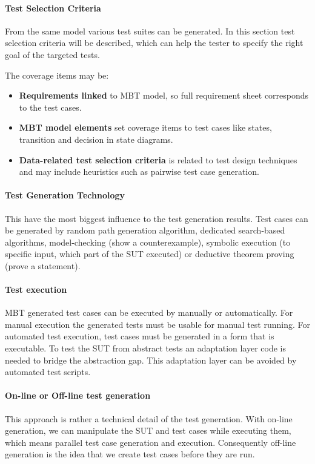 \paragraph{Test Selection Criteria}
From the same model various test suites can be generated. In this section test selection criteria will be described, which can help the tester to specify the right goal of the targeted tests. 

The coverage items may be:
\begin{itemize}
	\item \textbf{Requirements linked} to MBT model, so full requirement sheet corresponds to the test cases.
	\item \textbf{MBT model elements} set coverage items to test cases like states, transition and decision in state diagrams.
	\item \textbf{Data-related test selection criteria} is related to test design techniques and may include heuristics such as pairwise test case generation.
\end{itemize}

\paragraph{Test Generation Technology}
This have the most biggest influence to the test generation results. Test cases can be generated by random path generation algorithm, dedicated search-based algorithms, model-checking (show a counterexample), symbolic execution (to specific input, which part of the SUT executed) or deductive theorem proving (prove a statement).

\paragraph{Test execution}

MBT generated test cases can be executed by manually or automatically. For manual execution the generated tests must be usable for manual test running. For automated test execution, test cases must be generated in a form that is executable. To test the SUT from abstract tests an adaptation layer code is needed to bridge the abstraction gap. This adaptation layer can be avoided by automated test scripts.

\paragraph{On-line or Off-line test generation}
This approach is rather a technical detail of the test generation. With on-line generation, we can manipulate the SUT and test cases while executing them, which means parallel test case generation and execution. Consequently off-line generation is the idea that we create test cases before they are run.

